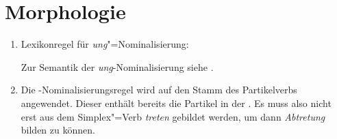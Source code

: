 \section{Morphologie}



\begin{enumerate}
\item

\eas
Lexikonregel für \emph{ung}"=Nominalisierung:\\
\label{lr-ung-nom}%
\zs

Zur Semantik der \emph{ung}-Nominalisierung siehe .

\item Die -Nominalisierungsregel wird auf den Stamm des Partikelverbs angewendet. Dieser
  enthält bereits die Partikel in der \compsl. Es muss also nicht erst aus dem Simplex"=Verb
  \emph{treten}  gebildet werden, um dann \emph{Abtretung} bilden zu können.

\end{enumerate}
